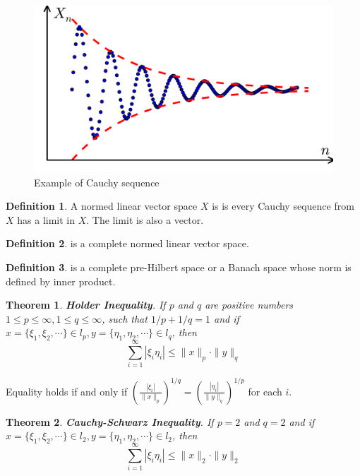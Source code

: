 \documentclass[a4paper]{article}
\theoremstyle{definition}
\newtheorem{definition}{Definition}
\theoremstyle{plain}
\newtheorem{theorem}{Theorem}
\begin{document}
\begin{figure}[H]
\centering
\includegraphics[scale=0.12]{figure/Cauchy_sequence}
\caption{Example of Cauchy sequence}
\end{figure}

\begin{definition}
A normed linear vector space $X$ is  is every Cauchy sequence from $X$ has a limit in $X$. The limit is also a vector.
\end{definition}

\begin{definition}
 is a complete normed linear vector space.
\end{definition}

\begin{definition}
 is a complete pre-Hilbert space or a Banach space whose norm is defined by inner product.
\end{definition}

\begin{theorem}
\textbf{Holder Inequality}. If $p$ and $q$ are positive numbers $1\le p\le\infty, 1\le q\le\infty$, such that $1/p+1/q=1$ and if $x=\{\xi_1,\xi_2,\cdots\}\in l_p, y=\{\eta_1,\eta_2,\cdots\}\in l_q$, then
\begin{equation*}
    \sum^\infty_{i=1}|\xi_i\eta_i|\le\|x\|_p\cdot\|y\|_q
\end{equation*}
\end{theorem}
Equality holds if and only if $\left(\frac{|\xi_i|}{\|x\|_p}\right)^{1/q}=\left(\frac{|\eta_i|}{\|y\|_q}\right)^{1/p}$ for each $i$.
\begin{theorem}
\textbf{Cauchy-Schwarz Inequality}. If $p=2$ and $q=2$ and if $x=\{\xi_1,\xi_2,\cdots\}\in l_2, y=\{\eta_1,\eta_2,\cdots\}\in l_2$, then
\begin{equation*}
    \sum^\infty_{i=1}|\xi_i\eta_i|\le\|x\|_2\cdot\|y\|_2
\end{equation*}
\end{theorem}
\end{document}
